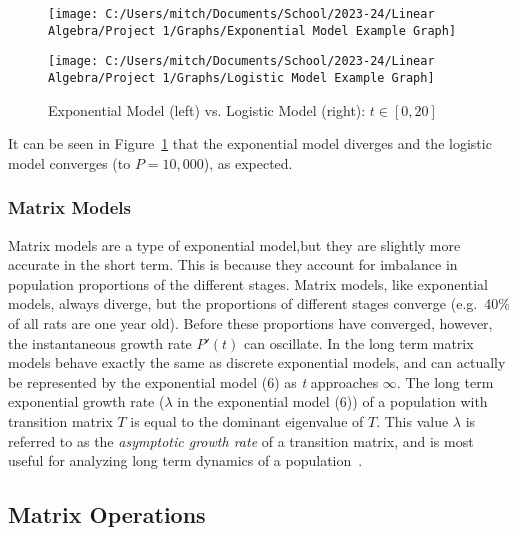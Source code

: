 \documentclass{article}
\begin{document}
    \begin{figure} [!h]
        \begin{minipage}{0.5\linewidth}
            \centering
            \texttt{[image: C:/Users/mitch/Documents/School/2023-24/Linear Algebra/Project 1/Graphs/Exponential Model Example Graph]}
            \caption*{$P'(t)=0.467P(t)$}
        \end{minipage}\hfill
        \begin{minipage}{0.5\linewidth}
            \centering
            \texttt{[image: C:/Users/mitch/Documents/School/2023-24/Linear Algebra/Project 1/Graphs/Logistic Model Example Graph]}
            \caption*{$P'(t)=10,000P(t) \cdot \left(\frac{1}{10,000}-P(t)\right)$}
        \end{minipage}
        \caption{Exponential Model (left) vs. Logistic Model (right): $t\in[0, 20]$}
        \label{fig:exp_v_log}
    \end{figure}

    It can be seen in Figure~\ref{fig:exp_v_log} that the exponential model diverges and the logistic model converges (to $P=10,000$), as expected.

    \subsubsection{Matrix Models}

    \hspace{\parindent}Matrix models are a type of exponential model,but they are slightly more accurate in the short term.
    This is because they account for imbalance in population proportions of the different stages.
    Matrix models, like exponential models, always diverge, but the proportions of different stages converge (e.g.\ 40\% of all rats are one year old).
    Before these proportions have converged, however, the instantaneous growth rate $P'(t)$ can oscillate.
    In the long term matrix models behave exactly the same as discrete exponential models, and can actually be represented by the exponential model (6) as \textit{t} approaches $\infty$.
    The long term exponential growth rate ($\lambda$ in the exponential model (6)) of a population with transition matrix $T$ is equal to the dominant eigenvalue of $T$.
    This value $\lambda$ is referred to as the \textit{asymptotic growth rate} of a transition matrix, and is most useful for analyzing long term dynamics of a population~\cite{shoemaker_lab_2024}.

    \subsection{Matrix Operations}\label{subsec:matrix-operations}
\end{document}

